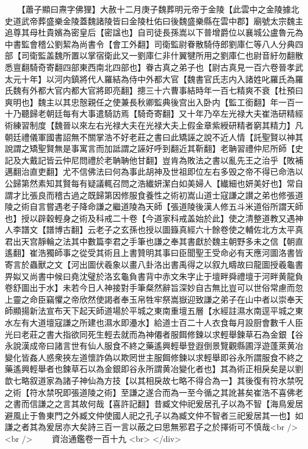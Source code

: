 　　【蕭子顯曰燾字佛狸】大赦十二月庚子魏葬明元帝于金陵【此雲中之金陵據北史道武帝葬盛樂金陵蓋魏諸陵皆曰金陵杜佑曰後魏盛樂縣在雲中郡】廟號太宗魏主追尊其母杜貴嬪為密皇后【密諡也】自司徒長孫嵩以下普增爵位以襄城公盧魯元為中書監會稽公劉絜為尚書令【會工外翻】司衛監尉眷散騎侍郎劉庫仁等八人分典四部【司衛監盖魏所置以掌宿衛此又一劉庫仁非什翼犍所用之劉庫仁也尉音紆勿翻散悉亶翻騎奇寄翻四部東西南北四部也】眷古真之弟子也【尉古真見一百六卷晉孝武太元十年】以河内鎮將代人羅結為侍中外都大官【魏書官氏志内入諸姓叱羅氏為羅氏魏有外都大官内都大官將即亮翻】摠三十六曹事結時年一百七精爽不衰【杜預曰爽明也】魏主以其忠慤親任之使兼長秋卿監典後宫出入卧内【監工銜翻】年一百一十乃聽歸老朝廷每有大事遣騎訪焉【騎奇寄翻】又十年乃卒左光禄大夫崔浩研精經術練習制度【魏晉以來左右光禄大夫在光禄大夫上假金章紫綬研精者窮其精力】凡朝廷禮儀軍國書詔無不關掌浩不好老莊之書曰此矯誣之說不近人情【託聖賢以神其說謂之矯聖賢無是事寓言而加詆謂之誣好呼到翻近其靳翻】老聃習禮仲尼所師【史記及大戴記皆云仲尼問禮於老聃聃他甘翻】豈肯為敗法之書以亂先王之治乎【敗補邁翻治直吏翻】尤不信佛法曰何為事此胡神及世祖即位左右多毁之帝不得已命浩以公歸第然素知其賢每有疑議輒召問之浩纎妍潔白如美婦人【纎細也妍美好也】常自謂才比張良而稽古過之既歸第因修服食養性之術初嵩山道士寇謙之讃之弟也修張道陵之術自言嘗遇老子降命謙之繼道陵為天師【張道陵後漢人修五斗米道俗所謂天師也】授以辟穀輕身之術及科戒二十卷【今道家科戒盖始於此】使之清整道教又遇神人李譜文【譜博古翻】云老子之玄孫也授以圖籙真經六十餘卷使之輔佐北方太平真君出天宫靜輪之法其中數篇李君之手筆也謙之奉其書獻於魏主朝野多未之信【朝直遙翻】崔浩獨師事之從受其術且上書贊明其事曰臣聞聖王受命必有天應河圖洛書皆寄言於蟲獸之文【河出圖伏羲象以畫八卦洛出書禹得之以叙九疇故曰龍圖授羲龜書畀姒又尚書中候曰堯沈璧於洛玄龜負書背中赤文朱字止于壇畔舜禮壇于河畔黄龍負卷舒圖出于水】未若今日人神接對手筆粲然辭旨深妙自古無比豈可以世俗常慮而忽上靈之命臣竊懼之帝欣然使謁者奉玉帛牲牢祭嵩嶽迎致謙之弟子在山中者以崇奉天師顯揚新法宣布天下起天師道場於平城之東南重壇五層【水經註濕水南逕平城之東水左有大道壇寇謙之所建也濕水即灅水】給道士百二十人衣食每月設厨會數千人臣光曰老莊之書大指欲同死生輕去就而為神僊者服餌修鍊以求輕舉鍊草石為金銀【谷永說漢成帝曰諸言世有仙人服食不終之藥遙興輕舉登遐倒景覽觀縣圃浮遊蓬萊黄冶變化皆姦人惑衆挾左道懷詐偽以欺罔世主服餌修鍊以求輕舉即谷永所謂服食不終之藥遙興輕舉者也鍊草石以為金銀即谷永所謂黄冶變化者也】其為術正相戾矣是以劉歆七略叙道家為諸子神仙為方技【以其相戾故七略不得合為一】其後復有符水禁呪之術【符水禁呪即張道陵之術】至謙之遂合而為一至今循之其訛甚矣崔浩不喜佛老之書而信謙之之言其故何哉【喜許記翻】昔臧文仲祀爰居孔子以為不智【海鳥爰居避風止于魯東門之外臧文仲使國人祀之孔子以為臧文仲不智者三祀爰居其一也】如謙之者其為爰居亦大矣詩三百一言以蔽之曰思無邪君子之於擇術可不慎哉<br />
<br />
　　資治通鑑卷一百十九  <br>
   </div> 

